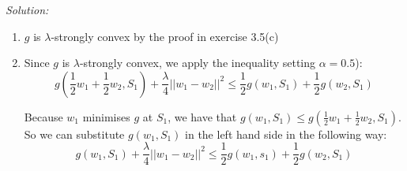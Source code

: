 \documentclass[
10pt, %
a4paper, %
oneside, %
headinclude,footinclude, %
BCOR5mm, %
]{scrartcl}
\newenvironment{solution}
               {\textit{Solution:}}
               {}
\begin{document}
\begin{solution}
  \begin{enumerate}
    \item $g$ is $\lambda$-strongly convex by the proof in exercise 3.5(c)
    \item Since $g$ is $\lambda$-strongly convex, we apply the inequality setting $\alpha=0.5$): $$g(\frac{1}{2} w_1 + \frac{1}{2}w_2, S_1) + \frac{\lambda}{4}||w_1-w_2||^2 \leq \frac{1}{2} g(w_1, S_1) + \frac{1}{2}g(w_2, S_1)$$

      Because $w_1$ minimises $g$ at $S_1$, we have that $g(w_1, S_1) \leq g(\frac{1}{2} w_1 + \frac{1}{2} w_2, S_1)$. So we can substitute $g(w_1, S_1)$ in the left hand side in the following way: $$g(w_1, S_1) + \frac{\lambda}{4}||w_1-w_2||^2 \leq \frac{1}{2}g(w_1, s_1) + \frac{1}{2}g(w_2, S_1)$$


\end{enumerate}
\end{solution}
\end{document}
